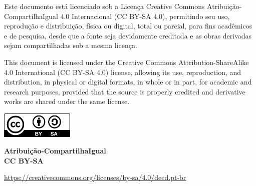 \begin{titlepage}
\thispagestyle{empty}
\begin{center}
  \vspace{1.5cm}
  \begin{minipage}{0.85\textwidth}
    \setlength{\parindent}{0pt}

    Este documento está licenciado sob a Licença Creative Commons Atribuição-CompartilhaIgual 4.0 Internacional (CC BY-SA 4.0), permitindo seu uso, reprodução e distribuição, física ou digital, total ou parcial, para fins acadêmicos e de pesquisa, desde que a fonte seja devidamente creditada e as obras derivadas sejam compartilhadas sob a mesma licença.

    \medskip
    This document is licensed under the Creative Commons Attribution-ShareAlike 4.0 International (CC BY-SA 4.0) license, allowing its use, reproduction, and distribution, in physical or digital formats, in whole or in part, for academic and research purposes, provided that the source is properly credited and derivative works are shared under the same license.
\end{minipage}


  \vspace{3cm}

  \includegraphics[width=3.5cm]{imagens/capa/cc-by-sa.png} 

  \medskip

  \textbf{Atribuição-CompartilhaIgual} \\
  \textbf{CC BY-SA}

  \vspace{0.5em}

  \href{https://creativecommons.org/licenses/by-sa/4.0/deed.pt-br}{https://creativecommons.org/licenses/by-sa/4.0/deed.pt-br}

  \vfill
\end{center}
\end{titlepage}